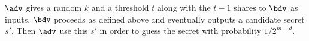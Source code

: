 \documentclass[envcountsame,runningheads,notitlepage]{llncs}
\begin{document}
	 $\adv$ gives a random $k$ and a threshold $t$ along with the $t-1$ shares to $\bdv$ as inputs. 
	 $\bdv$ proceeds as defined above and eventually outputs a candidate secret $s'$.
	 Then $\adv$ use this $s'$ in order to guess the secret with probability $1/2^{m - d}$.
	
	
	
	
\end{document}
